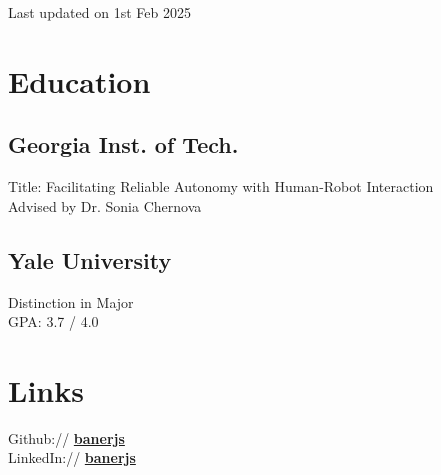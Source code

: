 \documentclass[]{deedy-resume}
\begin{document}
%
%
{\par\hfill{\scriptsize\color{gray}Last updated on 1st Feb 2025}}

%
%

%
%

\begin{minipage}[t]{0.33\textwidth}


\section{Education}

\subsection{Georgia Inst. of Tech.}
Title: Facilitating Reliable Autonomy with Human-Robot Interaction \\
Advised by Dr. Sonia Chernova
\sectionsep

\subsection{Yale University}
Distinction in Major \\
GPA: 3.7 / 4.0


\vspace{0.3cm}
\section{Links}
Github:// \href{https://github.com/banerjs}{\bf banerjs} \\
LinkedIn://  \href{https://www.linkedin.com/in/banerjs}{\bf banerjs} \\


\end{minipage}
\end{document}
